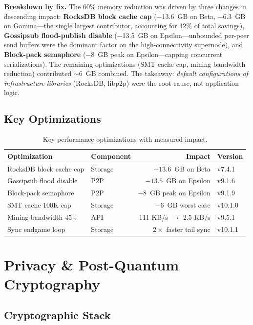 \documentclass[11pt,a4paper]{article}
\begin{document}
\noindent\textbf{Breakdown by fix.} The $60\%$ memory reduction was driven by three changes in descending impact: \textbf{RocksDB block cache cap} ($-$13.6~GB on Beta, $-$6.3~GB on Gamma---the single largest contributor, accounting for 42\% of total savings), \textbf{Gossipsub flood-publish disable} ($-$13.5~GB on Epsilon---unbounded per-peer send buffers were the dominant factor on the high-connectivity supernode), and \textbf{Block-pack semaphore} ($-$8~GB peak on Epsilon---capping concurrent serializations). The remaining optimizations (SMT cache cap, mining bandwidth reduction) contributed $\sim$6~GB combined. The takeaway: \emph{default configurations of infrastructure libraries} (RocksDB, libp2p) were the root cause, not application logic.

\subsection{Key Optimizations}

\begin{table}[H]
\centering
\small
\begin{tabular}{l l r l}
\toprule
\textbf{Optimization} & \textbf{Component} & \textbf{Impact} & \textbf{Version} \\
\midrule
RocksDB block cache cap & Storage & $-13.6$~GB on Beta & v7.4.1 \\
Gossipsub flood disable & P2P & $-13.5$~GB on Epsilon & v9.1.6 \\
Block-pack semaphore & P2P & $-8$~GB peak on Epsilon & v9.1.9 \\
SMT cache 100K cap & Storage & $-6$~GB worst case & v10.1.0 \\
Mining bandwidth 45$\times$ & API & 111 KB/s $\to$ 2.5 KB/s & v9.5.1 \\
Sync endgame loop & Storage & $2\times$ faster tail sync & v10.1.1 \\
\bottomrule
\end{tabular}
\caption{Key performance optimizations with measured impact.}
\end{table}

\section{Privacy \& Post-Quantum Cryptography}

\subsection{Cryptographic Stack}
\end{document}
